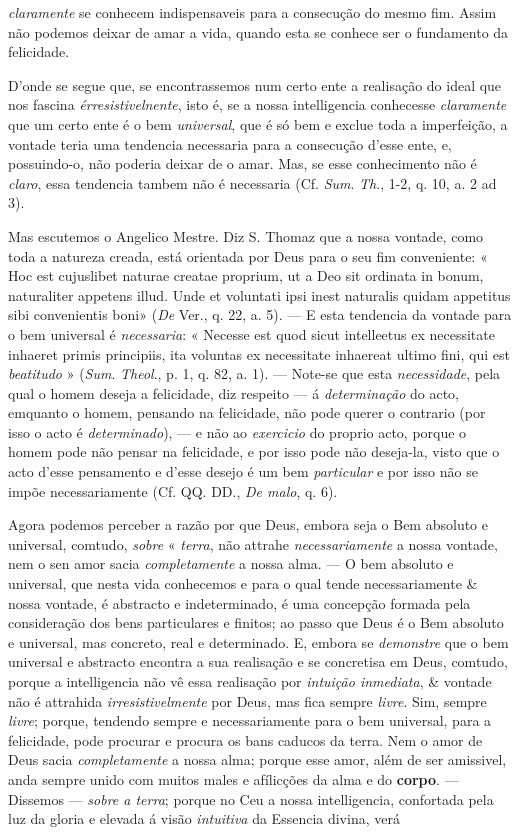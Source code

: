 \emph{claramente} se conhecem indispensaveis para a consecução do mesmo fim. Assim não podemos deixar de amar a vida, quando esta se conhece ser o fundamento da felicidade.\par D'onde se segue que, se encontrassemos num certo ente a realisação do ideal que nos fascina \emph{érresistivelnente}, isto é, se a nossa intelligencia conhecesse \emph{claramente} que um certo ente é o bem \emph{universal}, que é só bem e exclue toda a imperfeição, a vontade teria uma tendencia necessaria para a consecução d'esse ente, e, possuindo-o, não poderia deixar de o amar. Mas, se esse conhecimento não é \emph{claro}, essa tendencia tambem não é necessaria (Cf. \emph{Sum}. \emph{Th}., 1-2, q. 10, a. 2 ad 3).\par Mas escutemos o Angelico Mestre. Diz S. Thomaz que a nossa vontade, como toda a natureza creada, está orientada por Deus para o seu fim conveniente: « Hoc est cujuslibet naturae creatae proprium, ut a Deo sit ordinata in bonum, naturaliter appetens illud. Unde et voluntati ipsi inest naturalis quidam appetitus sibi convenientis boni» (\emph{De} Ver., q. 22, a. 5). --- E esta tendencia da vontade para o bem universal é \emph{necessaria}: « Necesse est quod sicut intelleetus ex necessitate inhaeret primis principiis, ita voluntas ex necessitate inhaereat ultimo fini, qui est \emph{beatitudo} » (\emph{Sum}. \emph{Theol}., p. 1, q. 82, a. 1). --- Note-se que esta \emph{necessidade}, pela qual o homem deseja a felicidade, diz respeito --- á \emph{determinação} do acto, emquanto o homem, pensando na felicidade, não pode querer o contrario (por isso o acto é \emph{determinado}), --- e não ao \emph{exercicio} do proprio acto, porque o homem pode não pensar na felicidade, e por isso pode não deseja-la, visto que o acto d'esse pensamento e d'esse desejo é um bem \emph{particular} e por isso não se impõe necessariamente (Cf. QQ. DD., \emph{De malo}, q. 6).\par Agora podemos perceber a razão por que Deus, embora seja o Bem absoluto e universal, comtudo, \emph{sobre} « \emph{terra}, não attrahe \emph{necessariamente} a nossa vontade, nem o sen amor sacia \emph{completamente} a nossa alma. --- O bem absoluto e universal, que nesta vida conhecemos e para o qual tende necessariamente \& nossa vontade, é abstracto e indeterminado, é uma concepção formada pela consideração dos bens particulares e finitos; ao passo que Deus é o Bem absoluto e universal, mas concreto, real e determinado. E, embora se \emph{demonstre} que o bem universal e abstracto encontra a sua realisação e se concretisa em Deus, comtudo, porque a intelligencia não vê essa realisação por \emph{intuição inmediata}, \& vontade não é attrahida \emph{irresistivelmente} por Deus, mas fica sempre \emph{livre}. Sim, sempre \emph{livre}; porque, tendendo sempre e necessariamente para o bem universal, para a felicidade, pode procurar e procura os bans caducos da terra. Nem o amor de Deus sacia \emph{completamente} a nossa alma; porque esse amor, além de ser amissivel, anda sempre unido com muitos males e afílicções da alma e do \textbf{corpo}. ---Dissemos --- \emph{sobre a terra}; porque no Ceu a nossa intelligencia, confortada pela luz da gloria e elevada á visão \emph{intuitiva} da Essencia divina, verá 